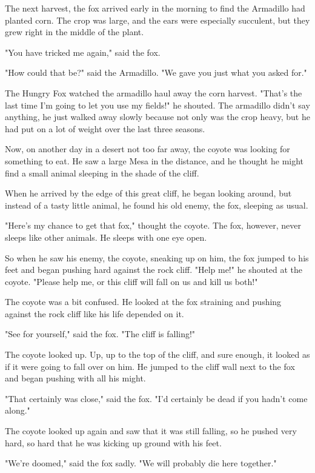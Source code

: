 The next harvest, the fox arrived early in the morning to find the Armadillo had planted corn. The crop was large, and the ears were especially succulent, but they grew right in the middle of the plant.

"You have tricked me again," said the fox.

"How could that be?" said the Armadillo. "We gave you just what you asked for."

The Hungry Fox watched the armadillo haul away the corn harvest. "That's the last time I'm going to let you use my fields!" he shouted. The armadillo didn't say anything, he just walked away slowly because not only was the crop heavy, but he had put on a lot of weight over the last three seasons.

Now, on another day in a desert not too far away, the coyote was looking for something to eat. He saw a large Mesa in the distance, and he thought he might find a small animal sleeping in the shade of the cliff.

When he arrived by the edge of this great cliff, he began looking around, but instead of a tasty little animal, he found his old enemy, the fox, sleeping as usual.

"Here's my chance to get that fox," thought the coyote. The fox, however, never sleeps like other animals. He sleeps with one eye open.

So when he saw his enemy, the coyote, sneaking up on him, the fox jumped to his feet and began pushing hard against the rock cliff. "Help me!" he shouted at the coyote. "Please help me, or this cliff will fall on us and kill us both!"

The coyote was a bit confused. He looked at the fox straining and pushing against the rock cliff like his life depended on it.

"See for yourself," said the fox. "The cliff is falling!"

The coyote looked up. Up, up to the top of the cliff, and sure enough, it looked as if it were going to fall over on him. He jumped to the cliff wall next to the fox and began pushing with all his might.

"That certainly was close," said the fox. "I'd certainly be dead if you hadn't come along."

The coyote looked up again and saw that it was still falling, so he pushed very hard, so hard that he was kicking up ground with his feet.

"We're doomed," said the fox sadly. "We will probably die here together."

